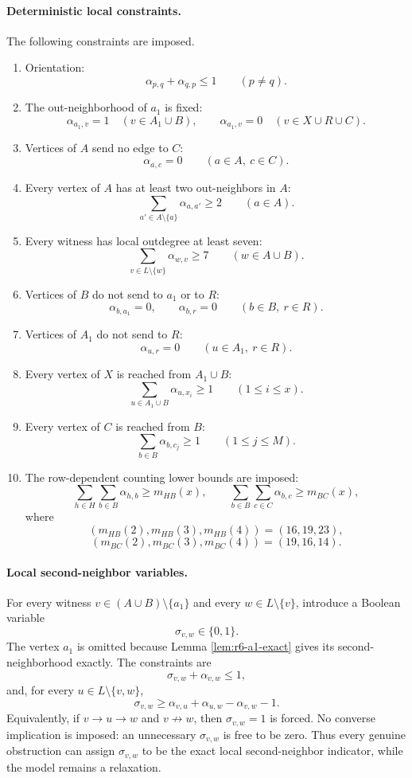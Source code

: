 \documentclass[a4paper,fleqn]{cas-sc}
\theoremstyle{definition}
\begin{document}
\paragraph{Deterministic local constraints.}
The following constraints are imposed.
\begin{enumerate}[label=(R6.\arabic*)]
\item Orientation:
\[
\alpha_{p,q}+\alpha_{q,p}\le 1\qquad(p\ne q).
\]
\item The out-neighborhood of $a_1$ is fixed:
\[
\alpha_{a_1,v}=1\quad(v\in A_1\cup B),
\qquad
\alpha_{a_1,v}=0\quad(v\in X\cup R\cup C).
\]
\item Vertices of $A$ send no edge to $C$:
\[
\alpha_{a,c}=0\qquad(a\in A,\ c\in C).
\]
\item Every vertex of $A$ has at least two out-neighbors in $A$:
\[
\sum_{a'\in A\setminus\{a\}}\alpha_{a,a'}\ge 2\qquad(a\in A).
\]
\item Every witness has local outdegree at least seven:
\[
\sum_{v\in L\setminus\{w\}}\alpha_{w,v}\ge 7\qquad(w\in A\cup B).
\]
\item Vertices of $B$ do not send to $a_1$ or to $R$:
\[
\alpha_{b,a_1}=0,
\qquad
\alpha_{b,r}=0\qquad(b\in B,
\ r\in R).
\]
\item Vertices of $A_1$ do not send to $R$:
\[
\alpha_{u,r}=0\qquad(u\in A_1,
\ r\in R).
\]
\item Every vertex of $X$ is reached from $A_1\cup B$:
\[
\sum_{u\in A_1\cup B}\alpha_{u,x_i}\ge 1\qquad(1\le i\le x).
\]
\item Every vertex of $C$ is reached from $B$:
\[
\sum_{b\in B}\alpha_{b,c_j}\ge 1\qquad(1\le j\le M).
\]
\item The row-dependent counting lower bounds are imposed:
\[
\sum_{h\in H}\sum_{b\in B}\alpha_{h,b}\ge m_{HB}(x),
\qquad
\sum_{b\in B}\sum_{c\in C}\alpha_{b,c}\ge m_{BC}(x),
\]
where
\[
(m_{HB}(2),m_{HB}(3),m_{HB}(4))=(16,19,23),
\]
\[
(m_{BC}(2),m_{BC}(3),m_{BC}(4))=(19,16,14).
\]
\end{enumerate}

\paragraph{Local second-neighbor variables.}
For every witness $v\in(A\cup B)\setminus\{a_1\}$ and every $w\in L\setminus\{v\}$, introduce a Boolean variable
\[
\sigma_{v,w}\in\{0,1\}.
\]
The vertex $a_1$ is omitted because Lemma \ref{lem:r6-a1-exact} gives its second-neighborhood exactly.  The constraints are
\[
\sigma_{v,w}+\alpha_{v,w}\le 1,
\]
and, for every $u\in L\setminus\{v,w\}$,
\[
\sigma_{v,w}\ge \alpha_{v,u}+\alpha_{u,w}-\alpha_{v,w}-1.
\]
Equivalently, if $v\to u\to w$ and $v\not\to w$, then $\sigma_{v,w}=1$ is forced.  No converse implication is imposed: an unnecessary $\sigma_{v,w}$ is free to be zero.  Thus every genuine obstruction can assign $\sigma_{v,w}$ to be the exact local second-neighbor indicator, while the model remains a relaxation.
\end{document}
